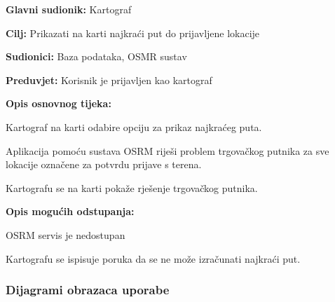 				\noindent {}
				\begin{packed_item}
					
					\item \textbf{Glavni sudionik: }Kartograf
					\item  \textbf{Cilj:} Prikazati na karti najkraći put do prijavljene lokacije
					\item  \textbf{Sudionici:} Baza podataka, OSMR sustav
					\item  \textbf{Preduvjet:} Korisnik je prijavljen kao kartograf
					\item  \textbf{Opis osnovnog tijeka:}
					
					\item[] \begin{packed_enum}
						
						\item Kartograf na karti odabire opciju za prikaz najkraćeg puta.
						\item Aplikacija pomoću sustava OSRM riješi problem trgovačkog putnika za sve lokacije označene za potvrdu prijave s terena.
						\item Kartografu se na karti pokaže rješenje trgovačkog putnika.
					\end{packed_enum}
					
					\item  \textbf{Opis mogućih odstupanja:}
					
					\item[] \begin{packed_item}
						
						\item[2.a] OSRM servis je nedostupan
						\item[] \begin{packed_enum}
							
							\item Kartografu se ispisuje poruka da se ne može izračunati najkraći put.
							
						\end{packed_enum}
						
					\end{packed_item}
				\end{packed_item}
					
				\newpage
				\subsubsection{Dijagrami obrazaca uporabe}
							
